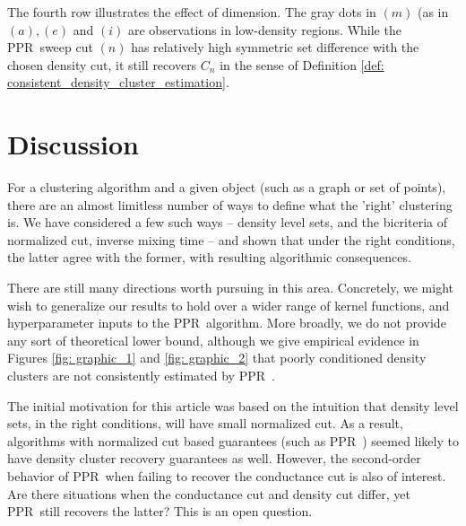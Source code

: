 \documentclass{article}
\newcommand{\1}{\mathbf{1}}
\newcommand{\pprspace}{{\sc PPR~}}
\theoremstyle{aldenthm}
\theoremstyle{aldenrmrk}
\begin{document}
The fourth row illustrates the effect of dimension. The gray dots in $(m)$ (as in $(a), (e)$ and $(i)$ are observations in low-density regions. While the \pprspace sweep cut $(n)$ has relatively high symmetric set difference with the chosen density cut, it still recovers $C_n$ in the sense of Definition \ref{def: consistent_density_cluster_estimation}.


\section{Discussion}
\label{sec: discussion}
For a clustering algorithm and a given object (such as a graph or set of points), there are an almost limitless number of ways to define what the 'right' clustering is. We have considered a few such ways -- density level sets, and the bicriteria of normalized cut, inverse mixing time -- and shown that under the right conditions, the latter agree with the former, with resulting algorithmic consequences.

There are still many directions worth pursuing in this area. Concretely, we might wish to generalize our results to hold over a wider range of kernel functions, and hyperparameter inputs to the \pprspace algorithm. More broadly, we do not provide any sort of theoretical lower bound, although we give empirical evidence in Figures \ref{fig: graphic_1} and \ref{fig: graphic_2} that poorly conditioned density clusters are not consistently estimated by \pprspace.

The initial motivation for this article was based on the intuition that density level sets, in the right conditions, will have small normalized cut. As a result, algorithms with normalized cut based guarantees (such as \pprspace) seemed likely to have density cluster recovery guarantees as well. However, the second-order behavior of \pprspace when failing to recover the conductance cut is also of interest. Are there situations when the conductance cut and density cut differ, yet \pprspace still recovers the latter? This is an open question.

\clearpage



\end{document}
